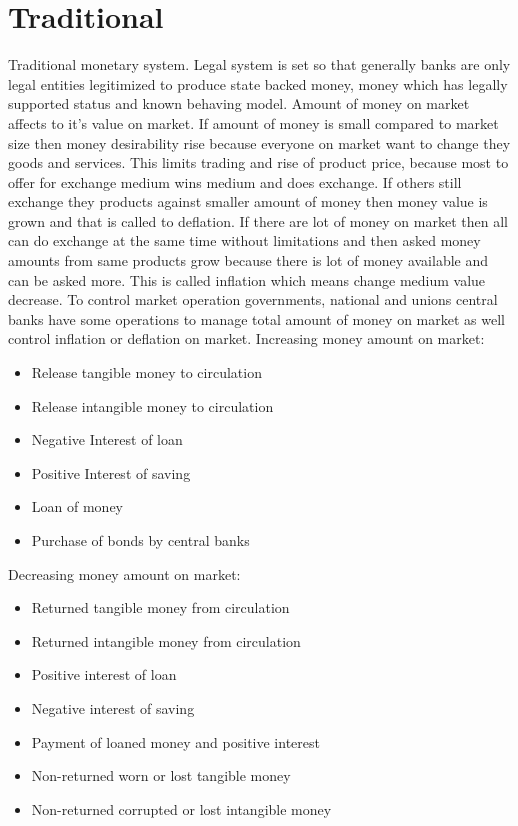\section{Traditional}
Traditional monetary system. Legal system is set so that generally banks are only legal entities legitimized to produce state backed money, money which has legally supported status and known behaving model. Amount of money on market affects to it's value on market. If amount of money is small compared to market size then money desirability rise because everyone on market want to change they goods and services. This limits trading and rise of product price, because most to offer for exchange medium wins medium and does exchange. If others still exchange they products against smaller amount of money then money value is grown and that is called to deflation. If there are lot of money on market then all can do exchange at the same time without limitations and then asked money amounts from same products grow because there is lot of money available and can be asked more. This is called inflation which means change medium value decrease. To control market operation governments, national and unions central banks have some operations to manage total amount of money on market as well control inflation or deflation on market.
\newline
Increasing money amount on market:
\begin{itemize}
\item Release tangible money to circulation
\item Release intangible money to circulation
\item Negative Interest of loan
\item Positive Interest of saving
\item Loan of money
\item Purchase of bonds by central banks
\end{itemize}

Decreasing money amount on market:
\begin{itemize}
\item Returned tangible money from circulation
\item Returned intangible money from circulation
\item Positive interest of loan
\item Negative interest of saving
\item Payment of loaned money and positive interest
\item Non-returned worn or lost tangible money
\item Non-returned corrupted or lost intangible money
\end{itemize}

